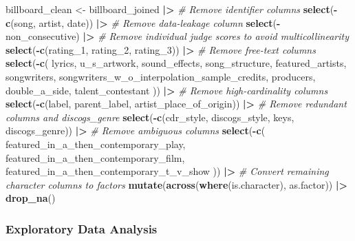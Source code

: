 \documentclass[
]{article}
\newenvironment{Shaded}{\begin{snugshade}}{\end{snugshade}}
\newcommand{\CommentTok}[1]{\textcolor[rgb]{0.56,0.35,0.01}{\textit{#1}}}
\newcommand{\FunctionTok}[1]{\textcolor[rgb]{0.13,0.29,0.53}{\textbf{#1}}}
\newcommand{\NormalTok}[1]{#1}
\newcommand{\OtherTok}[1]{\textcolor[rgb]{0.56,0.35,0.01}{#1}}
\newcommand{\SpecialCharTok}[1]{\textcolor[rgb]{0.81,0.36,0.00}{\textbf{#1}}}
\begin{document}
\begin{Shaded}
\begin{Highlighting}[]
\NormalTok{billboard\_clean }\OtherTok{\textless{}{-}}\NormalTok{ billboard\_joined }\SpecialCharTok{|\textgreater{}}
  \CommentTok{\# Remove identifier columns}
  \FunctionTok{select}\NormalTok{(}\SpecialCharTok{{-}}\FunctionTok{c}\NormalTok{(song, artist, date)) }\SpecialCharTok{|\textgreater{}}
  \CommentTok{\# Remove data{-}leakage column}
  \FunctionTok{select}\NormalTok{(}\SpecialCharTok{{-}}\NormalTok{non\_consecutive) }\SpecialCharTok{|\textgreater{}}
  \CommentTok{\# Remove individual judge scores to avoid multicollinearity}
  \FunctionTok{select}\NormalTok{(}\SpecialCharTok{{-}}\FunctionTok{c}\NormalTok{(rating\_1, rating\_2, rating\_3)) }\SpecialCharTok{|\textgreater{}}
  \CommentTok{\# Remove free{-}text columns}
  \FunctionTok{select}\NormalTok{(}\SpecialCharTok{{-}}\FunctionTok{c}\NormalTok{(}
\NormalTok{    lyrics,}
\NormalTok{    u\_s\_artwork,}
\NormalTok{    sound\_effects,}
\NormalTok{    song\_structure,}
\NormalTok{    featured\_artists,}
\NormalTok{    songwriters,}
\NormalTok{    songwriters\_w\_o\_interpolation\_sample\_credits,}
\NormalTok{    producers,}
\NormalTok{    double\_a\_side,}
\NormalTok{    talent\_contestant}
\NormalTok{  )) }\SpecialCharTok{|\textgreater{}}
  \CommentTok{\# Remove high{-}cardinality columns}
  \FunctionTok{select}\NormalTok{(}\SpecialCharTok{{-}}\FunctionTok{c}\NormalTok{(label, parent\_label, artist\_place\_of\_origin)) }\SpecialCharTok{|\textgreater{}}
  \CommentTok{\# Remove redundant columns and discogs\_genre}
  \FunctionTok{select}\NormalTok{(}\SpecialCharTok{{-}}\FunctionTok{c}\NormalTok{(cdr\_style, discogs\_style, keys, discogs\_genre)) }\SpecialCharTok{|\textgreater{}}
  \CommentTok{\# Remove ambiguous columns}
  \FunctionTok{select}\NormalTok{(}\SpecialCharTok{{-}}\FunctionTok{c}\NormalTok{(}
\NormalTok{    featured\_in\_a\_then\_contemporary\_play,}
\NormalTok{    featured\_in\_a\_then\_contemporary\_film,}
\NormalTok{    featured\_in\_a\_then\_contemporary\_t\_v\_show}
\NormalTok{  )) }\SpecialCharTok{|\textgreater{}}
  \CommentTok{\# Convert remaining character columns to factors}
  \FunctionTok{mutate}\NormalTok{(}\FunctionTok{across}\NormalTok{(}\FunctionTok{where}\NormalTok{(is.character), as.factor)) }\SpecialCharTok{|\textgreater{}}
  \FunctionTok{drop\_na}\NormalTok{()}
\end{Highlighting}
\end{Shaded}

\subsubsection{Exploratory Data
Analysis}\label{exploratory-data-analysis}
\end{document}
